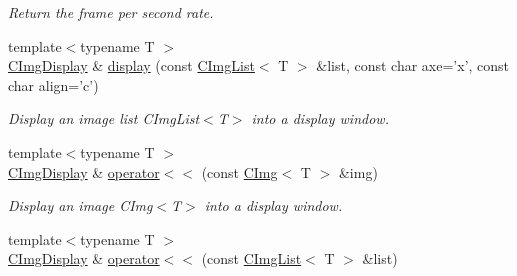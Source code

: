 \begin{DoxyCompactItemize}
\begin{DoxyCompactList}\small\item\em Return the frame per second rate. \end{DoxyCompactList}\item 
{\footnotesize template$<$typename T $>$ }\\\hyperlink{structcimg__library_1_1_c_img_display}{C\-Img\-Display} \& \hyperlink{structcimg__library_1_1_c_img_display_a8d14dda87c19a6c6766ce4cbf21c87ee}{display} (const \hyperlink{structcimg__library_1_1_c_img_list}{C\-Img\-List}$<$ T $>$ \&list, const char axe='x', const char align='c')
\begin{DoxyCompactList}\small\item\em Display an image list C\-Img\-List$<$\-T$>$ into a display window. \end{DoxyCompactList}\item 
\hypertarget{structcimg__library_1_1_c_img_display_ac12cd97aee16be8e25bfcd94d19ad8db}{{\footnotesize template$<$typename T $>$ }\\\hyperlink{structcimg__library_1_1_c_img_display}{C\-Img\-Display} \& \hyperlink{structcimg__library_1_1_c_img_display_ac12cd97aee16be8e25bfcd94d19ad8db}{operator$<$$<$} (const \hyperlink{structcimg__library_1_1_c_img}{C\-Img}$<$ T $>$ \&img)}\label{structcimg__library_1_1_c_img_display_ac12cd97aee16be8e25bfcd94d19ad8db}

\begin{DoxyCompactList}\small\item\em Display an image C\-Img$<$\-T$>$ into a display window. \end{DoxyCompactList}\item 
\hypertarget{structcimg__library_1_1_c_img_display_a598d806fa7fdb033a969a0e8df58afb4}{{\footnotesize template$<$typename T $>$ }\\\hyperlink{structcimg__library_1_1_c_img_display}{C\-Img\-Display} \& \hyperlink{structcimg__library_1_1_c_img_display_a598d806fa7fdb033a969a0e8df58afb4}{operator$<$$<$} (const \hyperlink{structcimg__library_1_1_c_img_list}{C\-Img\-List}$<$ T $>$ \&list)}\label{structcimg__library_1_1_c_img_display_a598d806fa7fdb033a969a0e8df58afb4}


\end{DoxyCompactItemize}
